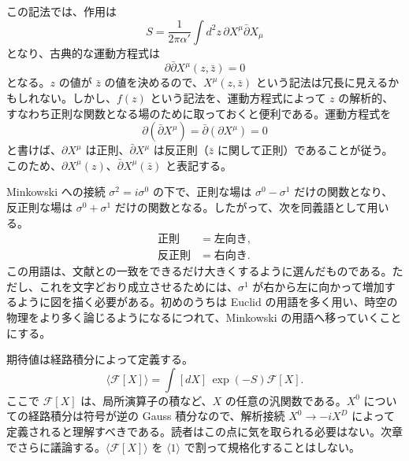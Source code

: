 この記法では、作用は
\begin{equation}
S=\frac{1}{2\pi\alpha'}\int d^2z\,\partial X^\mu\bar\partial X_\mu
\tag{2.1.10}\label{eq:2.1.10}
\end{equation}
となり、古典的な運動方程式は
\begin{equation}
\partial\bar\partial X^\mu(z,\bar z)=0
\tag{2.1.11}\label{eq:2.1.11}
\end{equation}
となる。$z$ の値が $\bar z$ の値を決めるので、$X^\mu(z,\bar z)$ という記法は冗長に見えるかもしれない。しかし、$f(z)$ という記法を、運動方程式によって $z$ の解析的、すなわち正則な関数となる場のために取っておくと便利である。運動方程式を
\begin{equation}
\partial(\bar\partial X^\mu)=\bar\partial(\partial X^\mu)=0
\tag{2.1.12}\label{eq:2.1.12}
\end{equation}
と書けば、$\partial X^\mu$ は正則、$\bar\partial X^\mu$ は反正則（$\bar z$ に関して正則）であることが従う。このため、$\partial X^\mu(z)$、$\bar\partial X^\mu(\bar z)$ と表記する。

Minkowski への接続 $\sigma^2=i\sigma^0$ の下で、正則な場は $\sigma^0-\sigma^1$ だけの関数となり、反正則な場は $\sigma^0+\sigma^1$ だけの関数となる。したがって、次を同義語として用いる。
\begin{align}
\text{正則}&=\text{左向き},\tag{2.1.13a}\label{eq:2.1.13a}\\
\text{反正則}&=\text{右向き}.\tag{2.1.13b}\label{eq:2.1.13b}
\end{align}
この用語は、文献との一致をできるだけ大きくするように選んだものである。ただし、これを文字どおり成立させるためには、$\sigma^1$ が右から左に向かって増加するように図を描く必要がある。初めのうちは Euclid の用語を多く用い、時空の物理をより多く論じるようになるにつれて、Minkowski の用語へ移っていくことにする。

期待値は経路積分によって定義する。
\begin{equation}
\langle\mathcal F[X]\rangle=\int[dX]\,\exp(-S)\mathcal F[X].
\tag{2.1.14}\label{eq:2.1.14}
\end{equation}
ここで $\mathcal F[X]$ は、局所演算子の積など、$X$ の任意の汎関数である。$X^0$ についての経路積分は符号が逆の Gauss 積分なので、解析接続 $X^0\to-iX^D$ によって定義されると理解すべきである。読者はこの点に気を取られる必要はない。次章でさらに議論する。$\langle\mathcal F[X]\rangle$ を $\langle1\rangle$ で割って規格化することはしない。

